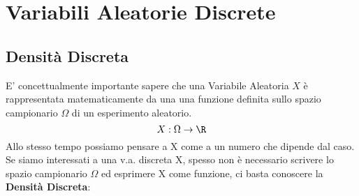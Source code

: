 


	\pagebreak
	\section{Variabili Aleatorie Discrete}

	\subsection{Densità Discreta}
	E' concettualmente importante sapere che una Variabile Aleatoria $X$ è rappresentata matematicamente da una
	una funzione definita sullo spazio campionario $\Omega$ di un esperimento aleatorio.
	\[
		X:\Omega \to \R
	\]
	Allo stesso tempo possiamo pensare a X come a un numero che dipende dal caso.
	Se siamo interessati a una v.a. discreta X, spesso non è necessario scrivere lo
	spazio campionario $\Omega$ ed esprimere X come funzione,
	ci basta conoscere la \textbf{Densità Discreta}:

